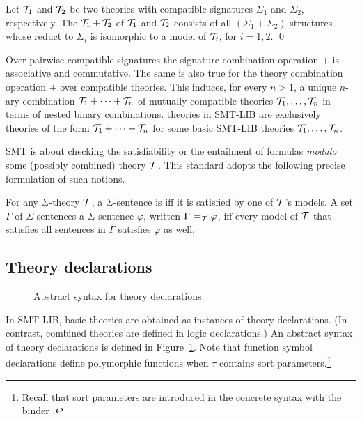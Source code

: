 \begin{definition}
\label{def:theorycomb}
Let $\mathcal{T}_1$ and $\mathcal{T}_2$ be two theories 
with compatible signatures $\Sigma_1$ and $\Sigma_2$, respectively. 
The  $\mathcal{T}_1 + \mathcal{T}_2$ of $\mathcal{T}_1$ and $\mathcal{T}_2$
consists of all $(\Sigma_1+\Sigma_2)$-structures
whose reduct to $\Sigma_i$ is isomorphic to a model of $\mathcal{T}_i$,
for $i=1,2$.
\qed
\end{definition}

Over pairwise compatible signatures
the signature combination operation $+$ is associative and commutative.
The same is also true for the theory combination operation $+$ over
compatible theories.
This induces, for every $n > 1$,
a unique $n$-ary combination $\mathcal{T}_1 + \cdots + \mathcal{T}_n$ 
of mutually compatible theories $\mathcal{T}_1,\ldots,\mathcal{T}_n$
in terms of nested binary combinations.
 theories in SMT-LIB are exclusively
theories of the form $\mathcal{T}_1 + \cdots + \mathcal{T}_n$ 
for some basic SMT-LIB theories $\mathcal{T}_1,\ldots,\mathcal{T}_n$.

SMT is about checking the satisfiability or the entailment 
of formulas \emph{modulo} some (possibly combined) theory $\mathcal{T}$.
This standard adopts the following precise formulation of such notions.

\begin{definition}
For any $\Sigma$-theory $\mathcal{T}$,
a $\Sigma$-sentence is 
iff it is satisfied by one of $\mathcal{T}$'s models.
A set $\Gamma$ of $\Sigma$-sentences
 a $\Sigma$-sentence $\varphi$,
written $\Gamma \models_{\mathcal{T}} \varphi$,
iff every model of $\mathcal{T}$ that satisfies all sentences in $\Gamma$
satisfies $\varphi$ as well.
\end{definition}


\subsection{Theory declarations} \label{sec:theory-decl}

\begin{figure}[t]
\theories
\caption{Abstract syntax for theory declarations}
\label{fig:theory-declaration}
\end{figure}

In SMT-LIB, basic theories are obtained as instances of theory declarations.
(In contrast, combined theories are defined in logic declarations.)
An abstract syntax of theory declarations is defined in 
Figure~\ref{fig:theory-declaration}.
Note that function symbol declarations define polymorphic functions
when $\tau$ contains sort parameters.\footnote{%
Recall that sort parameters are introduced
in the concrete syntax with the binder .
}


